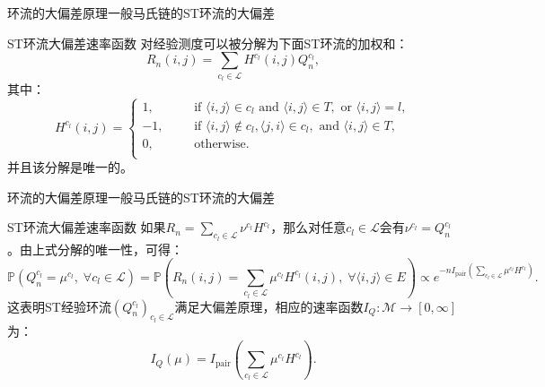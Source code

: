 \documentclass{beamer}
\begin{document}
\begin{frame}{环流的大偏差原理}{一般马氏链的ST环流的大偏差}
	\begin{block}{ST环流大偏差速率函数}
		对经验测度可以被分解为下面ST环流的加权和：
		\begin{equation*}
			R_n(i,j) = \sum_{c_l\in\mathcal{L}}H^{c_l}(i,j)Q^{c_l}_n,
		\end{equation*}
		其中：
		\begin{equation*}\label{cycle function2}
			H^{c_l}(i,j)
			=\left\{\begin{aligned}
				1,  &  &  & \text{if } \langle i,j\rangle \in c_l \text{ and }\langle i,j\rangle \in T, \text{ or } \langle i,j\rangle=l, \\
				-1, &  &  & \text{if } \langle i,j\rangle\notin c_l,\langle j,i\rangle \in c_l,\text{ and }\langle i,j\rangle \in T,      \\
				0,  &  &  & \text{otherwise}.                                                                                             \\
			\end{aligned}\right.
		\end{equation*}
		并且该分解是唯一的。
	\end{block}
\end{frame}

\begin{frame}{环流的大偏差原理}{一般马氏链的ST环流的大偏差}
	\begin{block}{ST环流大偏差速率函数}
		如果$R_n =\sum_{c_l \in \mathcal{L}}\nu^{c_l}H^{c_l}$，那么对任意$c_l \in \mathcal{L}$会有$\nu^{c_l}=Q_n^{c_l}$。由上式分解的唯一性，可得：
		{\footnotesize
		\begin{equation*}
			\mathbb{P}(Q_n^{c_l}=\mu^{c_l},\;\forall c_l\in\mathcal{L})
			=\mathbb{P}\left(R_n(i,j)=\sum_{c_l\in\mathcal{L}}\mu^{c_l}H^{c_l}(i,j),\;\forall\langle i,j\rangle\in E\right)
			\propto e^{-n I_{\mathrm{pair}}\left(\sum_{c_l\in\mathcal{L}}\mu^{c_l}H^{c_l}\right)}.
		\end{equation*}}
		这表明ST经验环流$(Q_n^{c_l})_{c_l\in\mathcal{L}}$满足大偏差原理，相应的速率函数$I_Q:\mathcal{M}\rightarrow[0,\infty]$为：
		\begin{equation*}\label{formula:I_Q}
			I_Q(\mu)=I_{\mathrm{pair}}\left(\sum_{c_l\in\mathcal{L}}\mu^{c_l}H^{c_l}\right).
		\end{equation*}
	\end{block}
\end{frame}
\end{document}
